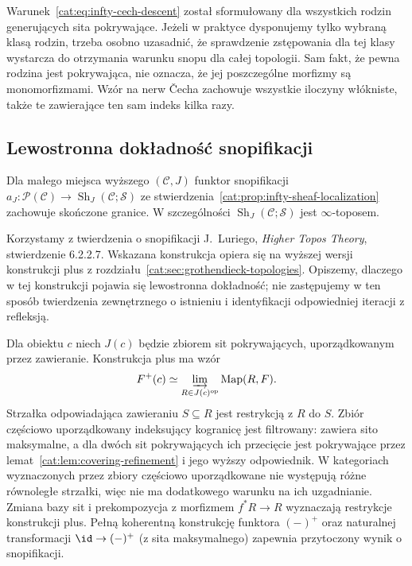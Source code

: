 \begin{uwaga}\label{cat:rem:infty-cech-covering-families}
Warunek~\eqref{cat:eq:infty-cech-descent} został sformułowany dla wszystkich rodzin generujących sita pokrywające. Jeżeli w praktyce dysponujemy tylko wybraną klasą rodzin, trzeba osobno uzasadnić, że sprawdzenie zstępowania dla tej klasy wystarcza do otrzymania warunku snopu dla całej topologii. Sam fakt, że pewna rodzina jest pokrywająca, nie oznacza, że jej poszczególne morfizmy są monomorfizmami. Wzór na nerw Čecha zachowuje wszystkie iloczyny włókniste, także te zawierające ten sam indeks kilka razy.
\end{uwaga}

\subsection{Lewostronna dokładność snopifikacji}

\begin{twierdzenie}\label{cat:thm:infty-sheafification-lex}
Dla małego miejsca wyższego $(\mathcal C,J)$ funktor snopifikacji $a_J:\mathcal P(\mathcal C)\to\operatorname{Sh}_J(\mathcal C;\mathcal S)$ ze stwierdzenia~\ref{cat:prop:infty-sheaf-localization} zachowuje skończone granice. W szczególności $\operatorname{Sh}_J(\mathcal C;\mathcal S)$ jest $\infty$-toposem.
\end{twierdzenie}

Korzystamy z twierdzenia o snopifikacji J.~Luriego, \emph{Higher Topos Theory}, stwierdzenie 6.2.2.7. Wskazana konstrukcja opiera się na wyższej wersji konstrukcji plus z rozdziału~\ref{cat:sec:grothendieck-topologies}. Opiszemy, dlaczego w tej konstrukcji pojawia się lewostronna dokładność; nie zastępujemy w ten sposób twierdzenia zewnętrznego o istnieniu i identyfikacji odpowiedniej iteracji z refleksją.

Dla obiektu $c$ niech $J(c)$ będzie zbiorem sit pokrywających, uporządkowanym przez zawieranie. Konstrukcja plus ma wzór
\[
 F^+(c)\simeq\varinjlim_{R\in J(c)^{\mathrm{op}}}\operatorname{Map}(R,F).
\]
Strzałka odpowiadająca zawieraniu $S\subseteq R$ jest restrykcją z $R$ do $S$. Zbiór częściowo uporządkowany indeksujący kogranicę jest filtrowany: zawiera sito maksymalne, a dla dwóch sit pokrywających ich przecięcie jest pokrywające przez lemat~\ref{cat:lem:covering-refinement} i jego wyższy odpowiednik. W kategoriach wyznaczonych przez zbiory częściowo uporządkowane nie występują różne równoległe strzałki, więc nie ma dodatkowego warunku na ich uzgadnianie. Zmiana bazy sit i prekompozycja z morfizmem $f^*R\to R$ wyznaczają restrykcje konstrukcji plus. Pełną koherentną konstrukcję funktora $(-)^+$ oraz naturalnej transformacji $\id\to(-)^+$ (z sita maksymalnego) zapewnia przytoczony wynik o snopifikacji.

